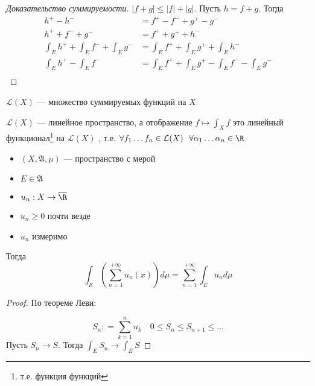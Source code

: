 \begin{proof}[Доказательство суммируемости]
    \(|f + g| \leq |f| + |g|\). Пусть \(h = f + g\). Тогда
    \begin{align*}
        h^{ +} - h^{ -}                                & = f^{ +} - f^{ -} + g^{ +} - g^{ -}                               \\
        h^{ +} + f^{ -} + g^{ - }                      & = f^{ + } + g^{ +} + h^{ -}                                       \\
        \int_E h^{ +} + \int_E f^{ -} + \int_E g^{ - } & = \int_E f^{ +} + \int_E g^{ +} + \int_E h^{ - }                  \\
        \int_E h^{ +} - \int_E f^{ - }                 & = \int_E f^{ +} + \int_E g^{ +} - \int_E f^{ - } - \int_E g^{ - } \\
    \end{align*}
\end{proof}
\begin{definition}
    \(\mathcal{L}(X)\) --- множество суммируемых функций на \(X\)
\end{definition}
\begin{corollary}[следствия]
    \(\mathcal{L}(X)\) --- линейное пространство, а отображение \(f \mapsto \int_X f\) это линейный функционал\footnote{т.е. функция функций} на \(\mathcal{L}(X)\)
    , т.е. \(\forall f_1 \dots f_n \in \mathcal{L}(X) \ \ \forall \alpha_1 \dots \alpha_n \in\R\)

    \? %
\end{corollary}

\begin{theorem}\itemfix
    \begin{itemize}
        \item \((X, \mathfrak{A}, \mu)\) --- пространство с мерой
        \item \(E\in \mathfrak{A}\)
        \item \(u_n : X \to \overline\R\)
        \item \(u_n \geq 0\) почти везде
        \item \(u_n\) измеримо
    \end{itemize}

    Тогда
    \[\int_E \left( \sum_{n = 1}^{+\infty} u_n(x) \right) d\mu = \sum_{n = 1}^{+\infty} \int_E u_n d\mu\]
\end{theorem}
\begin{proof}
    По теореме Леви:

    \[S_n : = \sum_{k = 1}^n u_k \quad 0 \leq S_n \leq S_{n+1} \leq \dots \]
    Пусть \(S_n \to S\). Тогда \(\int_E S_n \to \int_E S\)

\end{proof}

